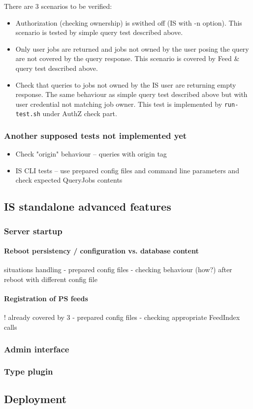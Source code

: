 There are 3 scenarios to be verified:
\begin{itemize}
 \item Authorization (checking ownership) is swithed off (IS with -n
   option). This scenario is tested by simple query test described above.
 \item Only user jobs are returned and jobs not owned by the user posing
   the query are not covered by the query response. This scenario is
   covered by Feed \& query test described above.
 \item Check that queries to jobs not owned by the IS user are
   returning empty response. The same behaviour as simple query test
   described above but with user credential not matching job
   owner. This test is implemented by \texttt{run-test.sh} under AuthZ
   check part.
\end{itemize}

\subsubsection{Another supposed tests not implemented yet}

\begin{itemize}
 \item Check "origin" behaviour -- queries with origin tag
 \item IS CLI tests -- use prepared config files and command line parameters
  and check expected QueryJobs contents
\end{itemize}


\subsection{IS standalone advanced features}

\subsubsection{Server startup}

\paragraph{Reboot persistency / configuration vs. database content}
    situations handling
- prepared config files
- checking behaviour (how?) after reboot with different config file

\paragraph{Registration of PS feeds}
! already covered by 3
- prepared config files
- checking appropriate FeedIndex calls

\subsubsection{Admin interface}

\subsubsection{Type plugin}

\subsection{Deployment}

